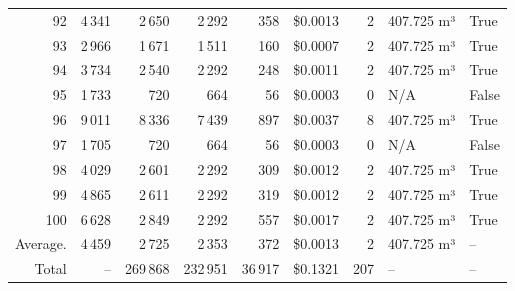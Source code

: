\documentclass[a4paper,11pt]{article}
\begin{document}
\begin{table}[ht]
\begin{tabular}{r r r r r r r p{3cm} l}
92 & 4\,341 & 2\,650 & 2\,292 & 358 & \$0.0013 & 2 & 407.725 m³ & True \\
93 & 2\,966 & 1\,671 & 1\,511 & 160 & \$0.0007 & 2 & 407.725 m³ & True \\
94 & 3\,734 & 2\,540 & 2\,292 & 248 & \$0.0011 & 2 & 407.725 m³ & True \\
95 & 1\,733 & 720 & 664 & 56 & \$0.0003 & 0 & N/A & False \\
96 & 9\,011 & 8\,336 & 7\,439 & 897 & \$0.0037 & 8 & 407.725 m³ & True \\
97 & 1\,705 & 720 & 664 & 56 & \$0.0003 & 0 & N/A & False \\
98 & 4\,029 & 2\,601 & 2\,292 & 309 & \$0.0012 & 2 & 407.725 m³ & True \\
99 & 4\,865 & 2\,611 & 2\,292 & 319 & \$0.0012 & 2 & 407.725 m³ & True \\
100 & 6\,628 & 2\,849 & 2\,292 & 557 & \$0.0017 & 2 & 407.725 m³ & True \\
\hline
Average. & 4\,459 & 2\,725 & 2\,353 & 372 & \$0.0013 & 2 & 407.725 m³ & -- \\
Total & -- & 269\,868 & 232\,951 & 36\,917 & \$0.1321 & 207 & -- & -- \\
\hline
\end{tabular}
\end{table}

\clearpage
\end{document}
